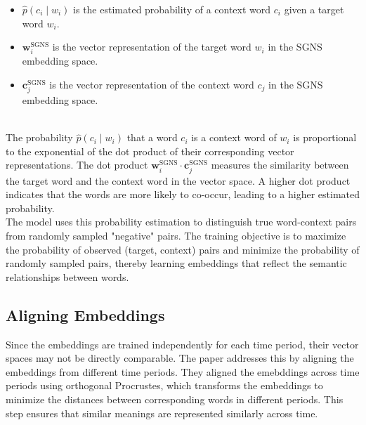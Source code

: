\begin{enumerate}
\begin{itemize}
    \item $\hat{p}(c_i \mid w_i)$ is the estimated probability of a context word $c_i$ given a target word $w_i$.
    \item $\mathbf{w}_i^{\text{SGNS}}$ is the vector representation of the target word $w_i$ in the SGNS embedding space.
    \item $\mathbf{c}_j^{\text{SGNS}}$ is the vector representation of the context word $c_j$ in the SGNS embedding space.
\end{itemize}

\\
The probability $\hat{p}(c_i \mid w_i)$ that a word $c_i$ is a context word of $w_i$ is proportional to the exponential of the dot product of their corresponding vector representations.
The dot product $\mathbf{w}_i^{\text{SGNS}} \cdot \mathbf{c}_j^{\text{SGNS}}$ measures the similarity between the target word and the context word in the vector space.
A higher dot product indicates that the words are more likely to co-occur, leading to a higher estimated probability.\\

The model uses this probability estimation to distinguish true word-context pairs from randomly sampled "negative" pairs.
The training objective is to maximize the probability of observed (target, context) pairs and minimize the probability of randomly sampled pairs, thereby learning embeddings that reflect the semantic relationships between words.

\end{enumerate}

\subsection{Aligning Embeddings}\label{subsec:aligning-embeddings}
Since the embeddings are trained independently for each time period, their vector spaces may not be directly comparable.
The paper addresses this by aligning the embeddings from different time periods.
They aligned the emebddings across time periods using orthogonal Procrustes, which transforms the embeddings to minimize the distances between corresponding words in different periods.
This step ensures that similar meanings are represented similarly across time.

